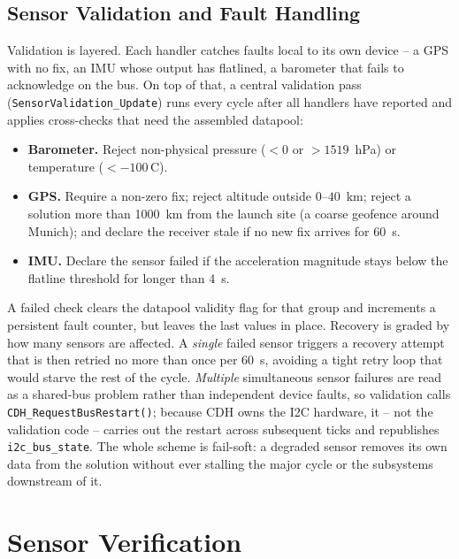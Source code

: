\subsection{Sensor Validation and Fault Handling}
\label{sec:cdh-validation}

Validation is layered. Each handler catches faults local to its own device
-- a GPS with no fix, an IMU whose output has flatlined, a barometer that
fails to acknowledge on the bus. On top of that, a central validation pass
(\texttt{SensorValidation\_Update}) runs every cycle after all handlers
have reported and applies cross-checks that need the assembled datapool:

\begin{itemize}
  \item \textbf{Barometer.} Reject non-physical pressure
        ($<0$ or $>1519$~hPa) or temperature ($<-100$\,\textdegree C).
  \item \textbf{GPS.} Require a non-zero fix; reject altitude outside
        $0$--$40$~km; reject a solution more than 1000~km from the launch
        site (a coarse geofence around Munich); and declare the receiver
        stale if no new fix arrives for 60~s.
  \item \textbf{IMU.} Declare the sensor failed if the acceleration
        magnitude stays below the flatline threshold for longer than 4~s.
\end{itemize}

A failed check clears the datapool validity flag for that group and
increments a persistent fault counter, but leaves the last values in place.
Recovery is graded by how many sensors are affected. A \emph{single} failed
sensor triggers a recovery attempt that is then retried no more than once
per 60~s, avoiding a tight retry loop that would starve the rest of the
cycle. \emph{Multiple} simultaneous sensor failures are read as a
shared-bus problem rather than independent device faults, so validation
calls \texttt{CDH\_RequestBusRestart()}; because CDH owns the I2C hardware,
it -- not the validation code -- carries out the restart across subsequent
ticks and republishes \texttt{i2c\_bus\_state}. The whole scheme is
fail-soft: a degraded sensor removes its own data from the solution without
ever stalling the major cycle or the subsystems downstream of it.

\section{Sensor Verification}
\label{sec:cdh-verification}

